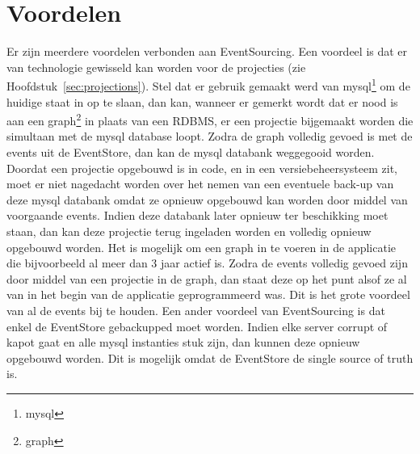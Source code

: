 
\chapter{Voordelen}
\label{ch:voordelen}

Er zijn meerdere voordelen verbonden aan EventSourcing. Een voordeel is dat er van technologie gewisseld kan worden voor de projecties (zie Hoofdstuk~\ref{sec:projections}). Stel dat er gebruik gemaakt werd van \gls{mysql}\footnote{\glsdesc{mysql}} om de huidige staat in op te slaan, dan kan, wanneer er gemerkt wordt dat er nood is aan een \gls{graph}\footnote{\glsdesc{graph}} in plaats van een \glsdesc{RDBMS}, er een projectie bijgemaakt worden die simultaan met de \gls{mysql} database loopt. Zodra de \gls{graph} volledig gevoed is met de events uit de EventStore, dan kan de \gls{mysql} databank weggegooid worden. Doordat een projectie opgebouwd is in code, en in een versiebeheersysteem zit, moet er niet nagedacht worden over het nemen van een eventuele back-up van deze \gls{mysql} databank omdat ze opnieuw opgebouwd kan worden door middel van voorgaande events. Indien deze databank later opnieuw ter beschikking moet staan, dan kan deze projectie terug ingeladen worden en volledig opnieuw opgebouwd worden.
Het is mogelijk om een \gls{graph} in te voeren in de applicatie die bijvoorbeeld al meer dan 3 jaar actief is. Zodra de events volledig gevoed zijn door middel van een projectie in de \gls{graph}, dan staat deze op het punt alsof ze al van in het begin van de applicatie geprogrammeerd was. Dit is het grote voordeel van al de events bij te houden.
Een ander voordeel van EventSourcing is dat enkel de EventStore gebackupped moet worden. Indien elke server corrupt of kapot gaat en alle \gls{mysql} instanties stuk zijn, dan kunnen deze opnieuw opgebouwd worden. Dit is mogelijk omdat de EventStore de single source of truth is.